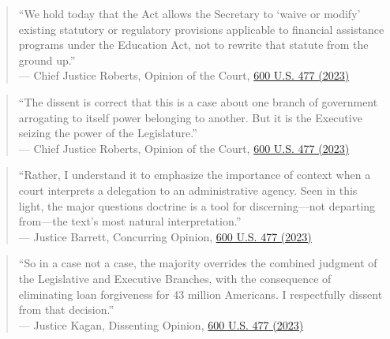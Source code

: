 \documentclass[12pt]{article}
\begin{document}
\begin{quote}
``We hold today that the Act allows the Secretary to `waive or modify' existing statutory or regulatory provisions applicable to financial assistance programs under the Education Act, not to rewrite that statute from the ground up.''\\
--- Chief Justice Roberts, Opinion of the Court, \href{https://www.law.cornell.edu/supremecourt/text/22-506}{600 U.S. 477 (2023)}
\end{quote}

\begin{quote}
``The dissent is correct that this is a case about one branch of government arrogating to itself power belonging to another. But it is the Executive seizing the power of the Legislature.''\\
--- Chief Justice Roberts, Opinion of the Court, \href{https://www.law.cornell.edu/supremecourt/text/22-506}{600 U.S. 477 (2023)}
\end{quote}

\begin{quote}
``Rather, I understand it to emphasize the importance of context when a court interprets a delegation to an administrative agency. Seen in this light, the major questions doctrine is a tool for discerning---not departing from---the text's most natural interpretation.''\\
--- Justice Barrett, Concurring Opinion, \href{https://www.law.cornell.edu/supremecourt/text/22-506}{600 U.S. 477 (2023)}
\end{quote}

\begin{quote}
``So in a case not a case, the majority overrides the combined judgment of the Legislative and Executive Branches, with the consequence of eliminating loan forgiveness for 43 million Americans. I respectfully dissent from that decision.''\\
--- Justice Kagan, Dissenting Opinion, \href{https://www.law.cornell.edu/supremecourt/text/22-506}{600 U.S. 477 (2023)}
\end{quote}
\end{document}
